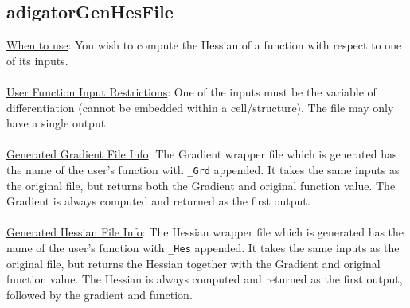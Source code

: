 \documentclass[10pt,pdftex]{article}
\begin{document}
\subsection{adigatorGenHesFile}
\underline{When to use}: You wish to compute the Hessian of a function with respect to one of its inputs.\\\\
\underline{User Function Input Restrictions}: One of the inputs must be the variable of differentiation (cannot be embedded within a cell/structure). The file may only have a single output.\\\\
\underline{Generated Gradient File Info}: The Gradient wrapper file which is generated has the name of the user's function with \texttt{\_Grd} appended. It takes the same inputs as the original file, but returns both the Gradient and original function value. The Gradient is always computed and returned as the first output.\\\\
\underline{Generated Hessian File Info}: The Hessian wrapper file which is generated has the name of the user's function with \texttt{\_Hes} appended. It takes the same inputs as the original file, but returns the Hessian together with the Gradient and original function value. The Hessian is always computed and returned as the first output, followed by the gradient and function.\\\\
\end{document}
